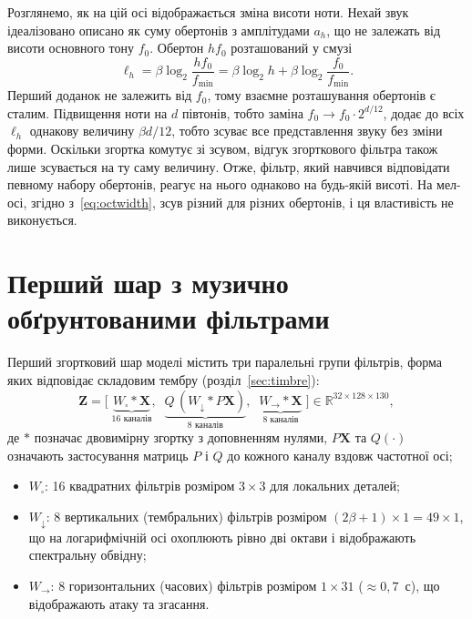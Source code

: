 Розглянемо, як на цій осі відображається зміна висоти ноти. Нехай звук
ідеалізовано описано як суму обертонів з амплітудами $a_h$, що не
залежать від висоти основного тону $f_0$. Обертон $h f_0$ розташований у
смузі
\begin{equation}
    \ell_h = \beta \log_2 \frac{h f_0}{f_{\min}}
    = \beta \log_2 h + \beta \log_2 \frac{f_0}{f_{\min}}.
\end{equation}
Перший доданок не залежить від $f_0$, тому взаємне розташування
обертонів є сталим. Підвищення ноти на $d$ півтонів, тобто заміна
$f_0 \to f_0 \cdot 2^{d/12}$, додає до всіх $\ell_h$ однакову величину
$\beta d / 12$, тобто зсуває все представлення звуку без зміни форми.
Оскільки згортка комутує зі зсувом, відгук згорткового фільтра також
лише зсувається на ту саму величину. Отже, фільтр, який навчився
відповідати певному набору обертонів, реагує на нього однаково на будь-якій
висоті. На мел-осі, згідно з~\eqref{eq:octwidth}, зсув різний для різних
обертонів, і ця властивість не виконується.

\section{Перший шар з музично обґрунтованими фільтрами}
\label{sec:firstlayer}

Перший згортковий шар моделі містить три паралельні групи фільтрів,
форма яких відповідає складовим тембру (розділ~\ref{sec:timbre}):
\begin{equation}
    \mathbf{Z} = \Big[\;
    \underbrace{W_{\square} * \mathbf{X}}_{16 \text{ каналів}},\;\;
    \underbrace{Q\,(W_{\downarrow} * P\mathbf{X})}_{8 \text{ каналів}},\;\;
    \underbrace{W_{\rightarrow} * \mathbf{X}}_{8 \text{ каналів}}
    \;\Big] \in \mathbb{R}^{32 \times 128 \times 130},
    \label{eq:firstlayer}
\end{equation}
де $*$ позначає двовимірну згортку з доповненням нулями, $P\mathbf{X}$ та
$Q(\cdot)$ означають застосування матриць $P$ і $Q$ до кожного каналу
вздовж частотної осі;
\begin{itemize}
    \item $W_{\square}$: 16 квадратних фільтрів розміром $3 \times 3$ для
    локальних деталей;
    \item $W_{\downarrow}$: 8 вертикальних (тембральних) фільтрів
    розміром $(2\beta + 1) \times 1 = 49 \times 1$, що на логарифмічній осі
    охоплюють рівно дві октави і відображають спектральну обвідну;
    \item $W_{\rightarrow}$: 8 горизонтальних (часових) фільтрів розміром
    $1 \times 31$ ($\approx 0{,}7$~с), що відображають атаку та згасання.
\end{itemize}

